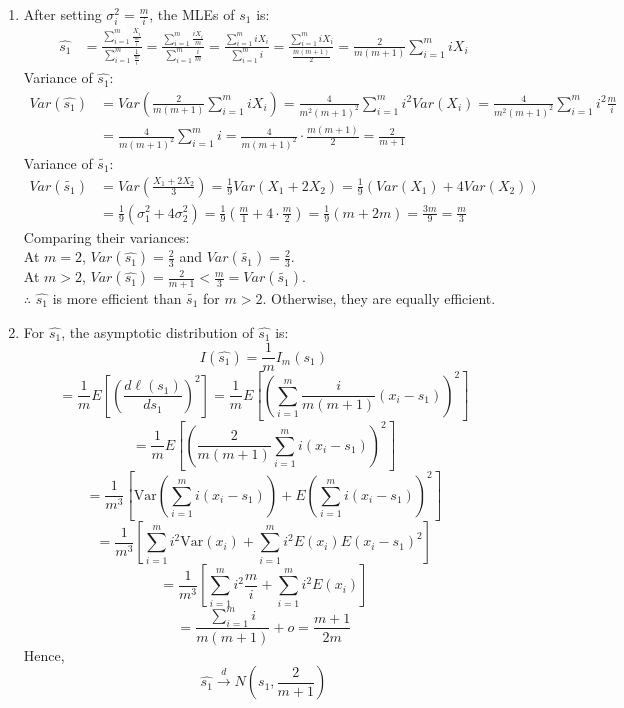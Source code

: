 \documentclass{article}
\begin{document}
\begin{enumerate}
\begin{enumerate}[label=(\roman*)]
    \item After setting $\sigma_i^2 = \frac{m}{i}$, the MLEs of $s_1$ is:
    \begin{align*}
    \hat{s_1} &= \frac{\sum_{i=1}^{m} \frac{X_i}{\frac{m}{i}}}{\sum_{i=1}^{m} \frac{1}{\frac{m}{i}}} = \frac{\sum_{i=1}^{m} \frac{iX_i}{m}}{\sum_{i=1}^{m} \frac{i}{m}} = \frac{\sum_{i=1}^{m} iX_i}{\sum_{i=1}^{m} i} = \frac{\sum_{i=1}^{m} iX_i}{\frac{m(m+1)}{2}} = \frac{2}{m(m+1)} \sum_{i=1}^{m} iX_i
    \end{align*}
    Variance of $\hat{s_1}$:
    \begin{align*}
    Var(\hat{s_1}) &= Var\left( \frac{2}{m(m+1)} \sum_{i=1}^{m} iX_i \right) = \frac{4}{m^2(m+1)^2} \sum_{i=1}^{m} i^2 Var(X_i) = \frac{4}{m^2(m+1)^2} \sum_{i=1}^{m} i^2 \frac{m}{i} \\
    &= \frac{4}{m(m+1)^2} \sum_{i=1}^{m} i = \frac{4}{m(m+1)^2} \cdot \frac{m(m+1)}{2} = \frac{2}{m+1}
    \end{align*}
    Variance of $\tilde{s_1}$:
    \begin{align*}
    Var(\tilde{s_1}) &= Var\left( \frac{X_1 + 2X_2}{3} \right) = \frac{1}{9} Var(X_1 + 2X_2) = \frac{1}{9} (Var(X_1) + 4Var(X_2)) \\
    &= \frac{1}{9} (\sigma_1^2 + 4\sigma_2^2) = \frac{1}{9} \left( \frac{m}{1} + 4 \cdot \frac{m}{2} \right) = \frac{1}{9} \left( m + 2m \right) = \frac{3m}{9} = \frac{m}{3}
    \end{align*}
    Comparing their variances: \\
    At $m=2$, $Var(\hat{s_1}) = \frac{2}{3}$ and $Var(\tilde{s_1}) = \frac{2}{3}$. \\
    At $m>2$, $Var(\hat{s_1}) = \frac{2}{m+1} < \frac{m}{3} = Var(\tilde{s_1})$. \\
    $\therefore$ $\hat{s_1}$ is more efficient than $\tilde{s_1}$ for $m>2$. Otherwise, they are equally efficient. 

    \item For $\hat{s_1}$, the asymptotic distribution of $\hat{s_1}$ is:
    \[
    I(\hat{s_1}) = \frac{1}{m} I_m(s_1)
    \]
    \[
    = \frac{1}{m} E \left[ \left( \frac{d \ell(s_1)}{d s_1} \right)^2 \right]
    = \frac{1}{m} E \left[ \left( \sum_{i=1}^{m} \frac{i}{m(m+1)} (x_i - s_1) \right)^2 \right]
    \]
    \[
    = \frac{1}{m} E \left[ \left( \frac{2}{m(m+1)} \sum_{i=1}^{m} i (x_i - s_1) \right)^2 \right]
    \]
    \[
    = \frac{1}{m^3} \left[ \text{Var} \left( \sum_{i=1}^{m} i (x_i - s_1) \right) + E \left( \sum_{i=1}^{m} i (x_i - s_1) \right)^2 \right]
    \]
    \[
    = \frac{1}{m^3} \left[ \sum_{i=1}^{m} i^2 \text{Var}(x_i) + \sum_{i=1}^{m} i^2 E(x_i) E(x_i - s_1)^2 \right]
    \]
    \[
    = \frac{1}{m^3} \left[ \sum_{i=1}^{m} i^2 \frac{m}{i} + \sum_{i=1}^{m} i^2 E(x_i) \right]
    \]
    \[
    = \frac{\sum_{i=1}^{m} i}{m(m+1)} + o
    = \frac{m+1}{2m}
    \]
    Hence,
    \[
    \hat{s_1} \xrightarrow{d} N \left( s_1, \frac{2}{m+1} \right)
    \]


\end{enumerate}
\end{enumerate}
\end{document}
